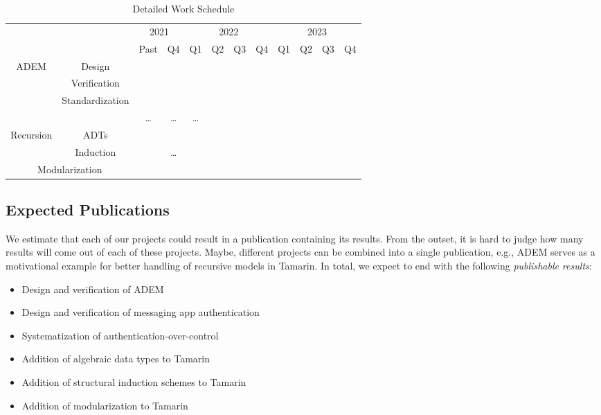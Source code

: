 \documentclass{article}
\begin{document}
\newcommand{\cc}{\cellcolor{black!10}}
\begin{table}[b]
  \centering
  \begin{tabular}{|c c|c c|c c c c|c c c c|}
    \hline
    & & \multicolumn{2}{c|}{2021} & \multicolumn{4}{c|}{2022} & \multicolumn{4}{c|}{2023} \\
    & & Past & Q4 & Q1 & Q2 & Q3 & Q4 & Q1 & Q2 & Q3 & Q4 \\
    \hline
    \multirow{4}{*}{\gls{ADEM}} & Design & \cc & \cc & \cc & \cc & \cc & & & & & \\
    & Verification & \cc & \cc & \cc & \cc & \cc & & & & & \\
    & Standardization & \cc & \cc & \cc & \cc & \cc & & & & & \\
    \hline
    \multicolumn{2}{|c|}{Messaging Authentication} & \cc & \dots & \dots & \dots & \cc & \cc & \cc & & & \\
    \hline
    \multirow{2}{*}{Recursion} & ADTs & \cc & \cc & \cc & & & & & & & \\
    & Induction & \cc & \dots & \cc & \cc & & & & & & \\
    \hline
    \multicolumn{2}{|c|}{Modularization} & & & & & \cc & \cc & \cc & & & \\
    \hline
  \end{tabular}
  \caption{Detailed Work Schedule}
  \label{tbl:schedule}
\end{table}

\subsection{Expected Publications}

We estimate that each of our projects could result in a publication containing its results.
From the outset, it is hard to judge how many results will come out of each of these projects.
Maybe, different projects can be combined into a single publication, e.g., \gls{ADEM} serves as a motivational example for better handling of recursive models in Tamarin.
In total, we expect to end with the following \textit{publishable results}:
\begin{itemize}
  \item Design and verification of \gls{ADEM}
  \item Design and verification of messaging app authentication
  \item Systematization of authentication-over-control
  \item Addition of algebraic data types to Tamarin
  \item Addition of structural induction schemes to Tamarin
  \item Addition of modularization to Tamarin
\end{itemize}
\end{document}
